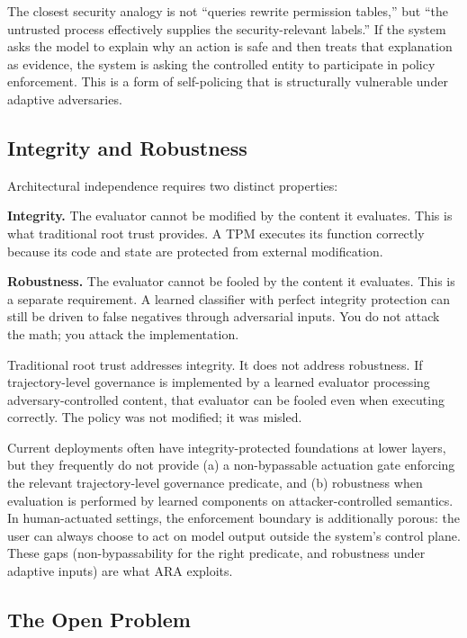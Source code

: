 \documentclass[11pt]{article}
\theoremstyle{definition}
\theoremstyle{plain}
\theoremstyle{remark}
\begin{document}
The closest security analogy is not ``queries rewrite permission tables,'' but ``the untrusted process effectively supplies the security-relevant labels.'' If the system asks the model to explain why an action is safe and then treats that explanation as evidence, the system is asking the controlled entity to participate in policy enforcement. This is a form of self-policing that is structurally vulnerable under adaptive adversaries.

\subsection{Integrity and Robustness}

Architectural independence requires two distinct properties:

\textbf{Integrity.} The evaluator cannot be modified by the content it evaluates. This is what traditional root trust provides. A TPM executes its function correctly because its code and state are protected from external modification.

\textbf{Robustness.} The evaluator cannot be fooled by the content it evaluates. This is a separate requirement. A learned classifier with perfect integrity protection can still be driven to false negatives through adversarial inputs. You do not attack the math; you attack the implementation.

Traditional root trust addresses integrity. It does not address robustness. If trajectory-level governance is implemented by a learned evaluator processing adversary-controlled content, that evaluator can be fooled even when executing correctly. The policy was not modified; it was misled.

Current deployments often have integrity-protected foundations at lower layers, but they frequently do not provide (a) a non-bypassable actuation gate enforcing the relevant trajectory-level governance predicate, and (b) robustness when evaluation is performed by learned components on attacker-controlled semantics. In human-actuated settings, the enforcement boundary is additionally porous: the user can always choose to act on model output outside the system's control plane. These gaps (non-bypassability for the right predicate, and robustness under adaptive inputs) are what ARA exploits.

\subsection{The Open Problem}
\end{document}
